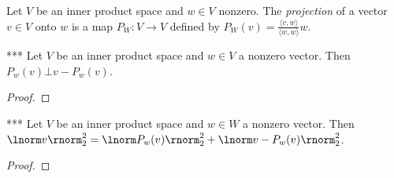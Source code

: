     \begin{definition}
        Let $V$ be an inner product space and $w\in V$ nonzero. The \textit{projection} of a vector $v\in V$ onto $w$ is a map $P_W:V \rightarrow V$ defined by $P_W(v) = \frac{\langle v,w \rangle}{\langle w,w \rangle}w$.
        \begin{center}
        \end{center}
    \end{definition}

    \begin{proposition}***
        Let $V$ be an inner product space and $w \in V$ a nonzero vector. Then $P_w(v) \bot v - P_w(v)$.
    \end{proposition}
        \begin{proof}
            
        \end{proof}

    \begin{corollary}***
        Let $V$ be an inner product space and $w \in W$ a nonzero vector. Then $\lnorm v \rnorm_2^2 = \lnorm P_w(v) \rnorm_2^2 + \lnorm v - P_w(v) \rnorm_2^2$.
    \end{corollary}
        \begin{proof}
            
        \end{proof}

